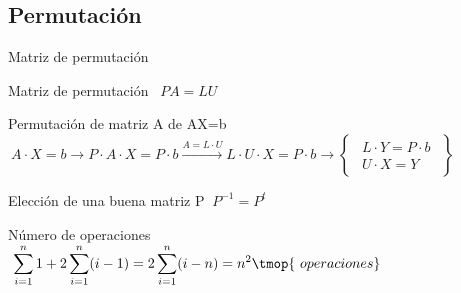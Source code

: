 \documentclass [8pt] {beamer}
\begin{document}
    \subsection{Permutación}
        \begin{frame}{Matriz de permutación}
            \begin{block}{Matriz de permutación}
                {\Large{\ $P A = L U $}} 
            \end{block}
            \begin{block}{Permutación de matriz A de AX=b}
                {$ \ A \cdot X = b \xrightarrow{} P \cdot A \cdot X = P \cdot b \xrightarrow{A = L \cdot U} L \cdot U
                \cdot X = P \cdot b \rightarrow \left\{ \begin{array}{l}
                \begin{array}{l}
                L \cdot Y = P \cdot b\\
                U \cdot X = Y
                \end{array}
                \end{array} \right\}$}
            \end{block}
            \begin{block}{Elección de una buena matriz P}
                {$ \ P^{- 1} = P^t$ }    
            \end{block}
            \begin{block}{Número de operaciones}
                {$\ \displaystyle\sum_{i = 1}^n 1 + 2 \displaystyle\sum_{i = 1}^n ( i - 1) = 2 \displaystyle\sum_{i = 1}^n ( i - n) =
                n^2 \tmop{\ operaciones}$}
            \end{block}
        \end{frame}
\end{document}

